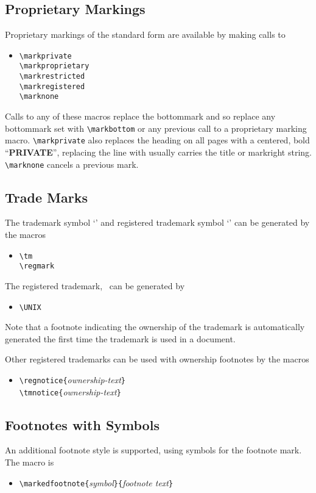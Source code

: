 \subsection{Proprietary Markings}
Proprietary markings of the standard form are available by making
calls to 
\begin{itemize}
\item[]
\verb|\markprivate|\\
\verb|\markproprietary|\\
\verb|\markrestricted|\\
\verb|\markregistered|\\
\verb|\marknone|
\end{itemize}
Calls to any of these macros replace the bottommark and so replace
any bottommark set with \verb|\markbottom| or any previous call to a
proprietary marking macro.  \verb|\markprivate| also replaces the
heading on all pages with a centered, bold ``{\bf PRIVATE}'',
replacing the line with usually carries the title or markright
string.  \verb|\marknone| cancels a previous mark.
\subsection{Trade Marks}
The trademark symbol `\tm ' and registered trademark symbol `\regmark ' 
can be generated by the macros
\begin{itemize}
\item[]
\verb|\tm|\\
\verb|\regmark|
\end{itemize}
The registered trademark, \UNIX\ can be generated by 
\begin{itemize}
\item[]
\verb|\UNIX|
\end{itemize}
Note that a footnote indicating the ownership of the trademark is
automatically generated the first time the trademark is used in a
document.

Other registered trademarks can be used with ownership footnotes by
the macros
\begin{itemize}
\item[]
\verb|\regnotice{|{\it ownership-text}\verb|}|\\
\verb|\tmnotice{|{\it ownership-text}\verb|}|
\end{itemize}
\subsection{Footnotes with Symbols}
An additional footnote style is supported, using symbols for the
footnote mark.  The macro is
\begin{itemize}
\item[]
\verb|\markedfootnote{|{\it symbol}\verb|}{|{\it footnote text}\verb|}|
\end{itemize}
